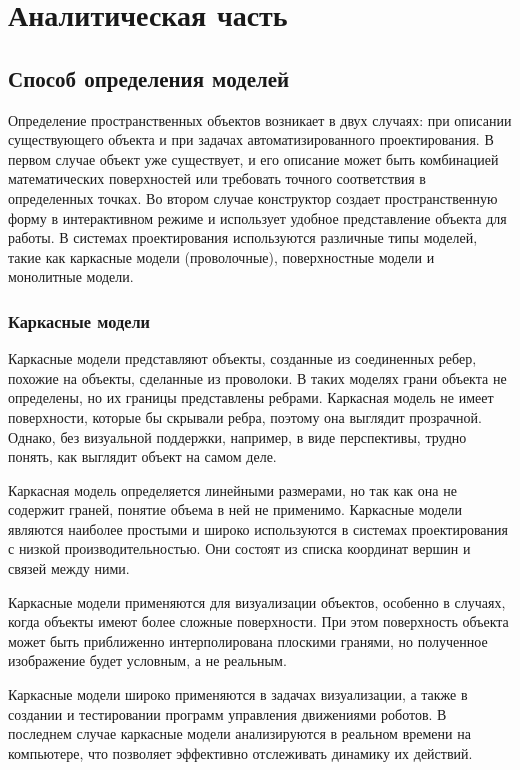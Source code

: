 
\chapter{Аналитическая часть}


\section{Способ определения моделей}

Определение пространственных объектов возникает в двух случаях: при описании существующего объекта и при задачах автоматизированного проектирования. В первом случае объект уже существует, и его описание может быть комбинацией математических поверхностей или требовать точного соответствия в определенных точках. Во втором случае конструктор создает пространственную форму в интерактивном режиме и использует удобное представление объекта для работы. В системах проектирования используются различные типы моделей, такие как каркасные модели (проволочные), поверхностные модели и монолитные модели.

\subsection{Каркасные модели}

Каркасные модели представляют объекты, созданные из соединенных ребер, похожие на объекты, сделанные из проволоки. В таких моделях грани объекта не определены, но их границы представлены ребрами. Каркасная модель не имеет поверхности, которые бы скрывали ребра, поэтому она выглядит прозрачной. Однако, без визуальной поддержки, например, в виде перспективы, трудно понять, как выглядит объект на самом деле.

Каркасная модель определяется линейными размерами, но так как она не содержит граней, понятие объема в ней не применимо. Каркасные модели являются наиболее простыми и широко используются в системах проектирования с низкой производительностью. Они состоят из списка координат вершин и связей между ними.

Каркасные модели применяются для визуализации объектов, особенно в случаях, когда объекты имеют более сложные поверхности. При этом поверхность объекта может быть приближенно интерполирована плоскими гранями, но полученное изображение будет условным, а не реальным.

Каркасные модели широко применяются в задачах визуализации, а также в создании и тестировании программ управления движениями роботов. В последнем случае каркасные модели анализируются в реальном времени на компьютере, что позволяет эффективно отслеживать динамику их действий.

